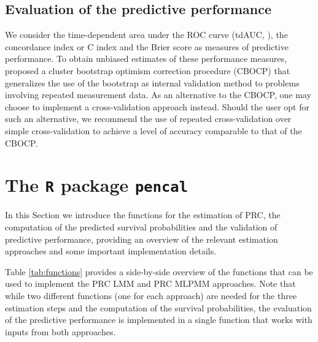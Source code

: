 \subsection{Evaluation of the predictive
performance}\label{evaluation-of-the-predictive-performance}

We consider the time-dependent area under the ROC curve (tdAUC,
\citet{heagerty2000}), the concordance index or C index
\citep{pencina2004} and the Brier score \citep{graf1999} as measures of
predictive performance. To obtain unbiased estimates of these
performance measures, \citet{signorelli2021} proposed a cluster
bootstrap optimism correction procedure (CBOCP) that generalizes the use
of the bootstrap as internal validation method to problems involving
repeated measurement data. As an alternative to the CBOCP, one may
choose to implement a cross-validation approach instead. Should the user
opt for such an alternative, we recommend the use of repeated
cross-validation over simple cross-validation to achieve a level of
accuracy comparable to that of the CBOCP.

\section{\texorpdfstring{The \texttt{R} package
\texttt{pencal}}{The R package pencal}}\label{the-r-package-pencal}

In this Section we introduce the functions for the estimation of PRC,
the computation of the predicted survival probabilities and the
validation of predictive performance, providing an overview of the
relevant estimation approaches and some important implementation
details.

Table \ref{tab:functions} provides a side-by-side overview of the
functions that can be used to implement the PRC LMM and PRC MLPMM
approaches. Note that while two different functions (one for each
approach) are needed for the three estimation steps and the computation
of the survival probabilities, the evaluation of the predictive
performance is implemented in a single function that works with inputs
from both approaches.

